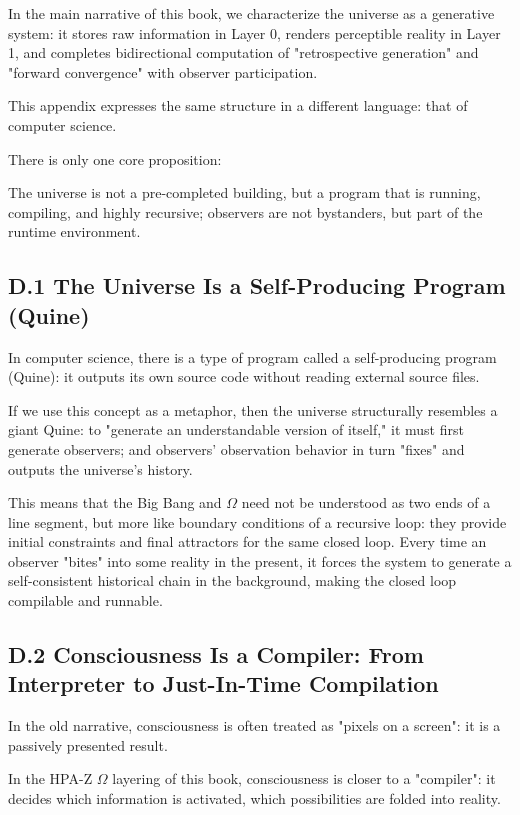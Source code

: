 In the main narrative of this book, we characterize the universe as a generative system: it stores raw information in Layer 0, renders perceptible reality in Layer 1, and completes bidirectional computation of "retrospective generation" and "forward convergence" with observer participation.

This appendix expresses the same structure in a different language: that of computer science.

There is only one core proposition:

The universe is not a pre-completed building, but a program that is running, compiling, and highly recursive; observers are not bystanders, but part of the runtime environment.

\subsection*{D.1 The Universe Is a Self-Producing Program (Quine)}

In computer science, there is a type of program called a self-producing program (Quine): it outputs its own source code without reading external source files.

If we use this concept as a metaphor, then the universe structurally resembles a giant Quine: to "generate an understandable version of itself," it must first generate observers; and observers' observation behavior in turn "fixes" and outputs the universe's history.

This means that the Big Bang and $\Omega$ need not be understood as two ends of a line segment, but more like boundary conditions of a recursive loop: they provide initial constraints and final attractors for the same closed loop. Every time an observer "bites" into some reality in the present, it forces the system to generate a self-consistent historical chain in the background, making the closed loop compilable and runnable.

\subsection*{D.2 Consciousness Is a Compiler: From Interpreter to Just-In-Time Compilation}

In the old narrative, consciousness is often treated as "pixels on a screen": it is a passively presented result.

In the HPA-Z $\Omega$ layering of this book, consciousness is closer to a "compiler": it decides which information is activated, which possibilities are folded into reality.

